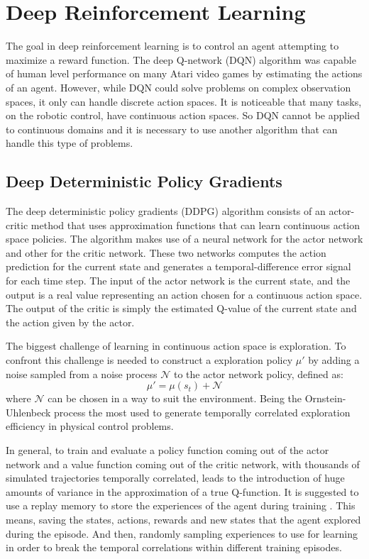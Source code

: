 \section*{Deep Reinforcement Learning}

The goal in deep reinforcement learning is to control an agent attempting to maximize a reward function. 
The deep Q-network (DQN) algorithm \cite{mnih2013playing} was capable of human level performance on many Atari video games by estimating the actions of an agent.
However, while DQN could solve problems on complex observation spaces, it only can handle discrete action spaces. 
It is noticeable that many tasks, on the robotic control, have continuous action spaces. 
So DQN cannot be applied to continuous domains and it is necessary to use another algorithm that can handle this type of problems.

\subsection*{Deep Deterministic Policy Gradients}

The deep deterministic policy gradients (DDPG) algorithm consists of an actor-critic method that uses approximation functions that can learn continuous action space policies. The algorithm makes use of a neural network for the actor network and other for the critic network. These two networks computes the action prediction  for the current state and generates a temporal-difference error signal for each time step. The input of the actor network is the current state, and the output is a real value representing an action chosen for a continuous action space. The output of the critic is simply the estimated Q-value of the current state and the action given by the actor.

The biggest challenge of learning in continuous action space is exploration.
To confront this challenge is needed to construct a exploration policy $\mu'$ by adding a noise sampled from a noise process $\mathcal{N}$ to the actor network policy, defined as:
\begin{equation}
\mu' = \mu(s_t) + \mathcal{N}
\end{equation}
where $\mathcal{N}$ can be chosen in a way to suit the environment.
Being the Ornstein-Uhlenbeck process \cite{uhlenbeck1930theory} the most used to generate temporally correlated exploration efficiency in physical control problems.

In general, to train and evaluate a policy function coming out of the actor network and a value function coming out of the critic network, with thousands of simulated trajectories temporally correlated, leads to the introduction of huge amounts of variance in the approximation of a true Q-function.
It is suggested to use a replay memory to store the experiences of the agent during training \cite{schaul2015prioritized}.
This means, saving the states, actions, rewards and new states that the agent explored during the episode.
And then, randomly sampling experiences to use  for learning in order to break the temporal correlations within different training episodes.

